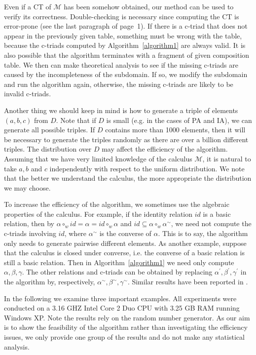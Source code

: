 \documentclass{llncs}
\newcommand{\qcm}{\mathcal{M}}
\begin{document}
Even if a CT of $\qcm$ has been somehow obtained, our method can be used to verify its correctness. Double-checking is necessary since computing the CT is error-prone (see the last paragraph of page~1). If there is a c-triad that does not appear in the previously given table, something must be wrong with the table, because the c-triads computed by Algorithm~\ref{algorithm1} are always valid. It is also possible that the algorithm terminates with a fragment of given composition table. We then can make theoretical analysis to see if the missing c-triads are caused by the incompleteness of the subdomain. If so, we modify the subdomain and run the algorithm again, otherwise, the missing c-triads are likely to be invalid c-triads.

Another thing we should keep in mind is how to generate a triple of elements  $(a,b,c)$ from $D$. Note that if $D$ is small (e.g. in the cases of PA and IA), we can generate all possible triples. If $D$ contains more than 1000 elements, then it will be necessary to generate the triples randomly as there are over a billion different triples. The distribution over $D$ may affect the efficiency of the algorithm. Assuming that we have very limited knowledge of the calculus $\qcm$, it is natural to take $a,b$ and $c$  independently with respect to the uniform distribution. We note that the better we understand the calculus, the more appropriate the distribution we may choose.

To increase the efficiency of the algorithm, we sometimes use the algebraic properties of the calculus. For example,  if the identity relation $id$ is a basic relation, then by $\alpha\circ_w id=\alpha=id\circ_w \alpha$ and $id \subseteq\alpha\circ_w\alpha^\sim$, we need not compute the c-triads involving $id$, where $\alpha^\sim$ is the converse of $\alpha$. This is to say, the algorithm only needs to generate pairwise different elements. As another example, suppose that the calculus is closed under converse, i.e. the converse of a basic relation is still a basic relation. Then in Algorithm~\ref{algorithm1} we need only compute $\alpha,\beta,\gamma$. The other relations and c-triads can be obtained by replacing $\alpha^\prime,\beta^\prime,\gamma^\prime$ in the algorithm by, respectively, $\alpha^\sim,\beta^\sim,\gamma^\sim$. Similar results have been reported in \cite{Bennett94}.


In the following we examine three important examples. All experiments were conducted on a 3.16 GHZ Intel Core 2 Duo CPU with 3.25 GB RAM running Windows XP.
Note the results rely on the random number generator. As our aim is to show the feasibility of the algorithm rather than investigating the efficiency issues, we only provide one group of the results and do not make any statistical analysis.
\end{document}

